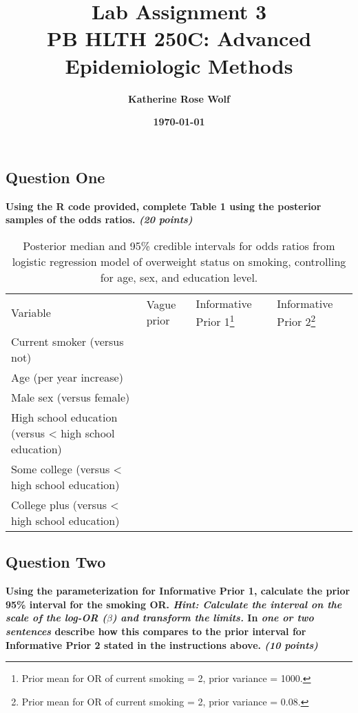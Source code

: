 \documentclass[
  11pt,
]{article}
\title{\fontsize{15pt}{5pt}\selectfont\textbf{Lab Assignment 3}\\
\vspace{.2cm}\textbf{PB HLTH 250C: Advanced Epidemiologic Methods}}
\author{\vspace{-.1cm}\fontsize{15pt}{0pt}\selectfont\textbf{Katherine Rose Wolf}}
\date{\vspace{-.3cm}\fontsize{15pt}{0pt}\selectfont\textbf{\today}}
\begin{document}
\maketitle

\hypertarget{question-one}{%
\subsection{Question One}\label{question-one}}

\textbf{Using the R code provided, complete Table 1 using the posterior samples of the odds ratios. \textit{(20 points)}}

\begin{landscape}
\begin{table}
\begin{minipage}{\textwidth}
\caption{Posterior median and 95\% credible intervals for odds ratios from logistic regression model of overweight status on smoking, controlling for age, sex, and education level.}
\begin{tabular}{llll}
\hline
  Variable & Vague prior & Informative Prior 1\footnote{Prior mean for OR of current smoking = 2, prior variance = 1000.} & Informative Prior 2\footnote{Prior mean for OR of current smoking = 2, prior variance = 0.08.} \\
  \cline{2-4}
Current smoker (versus not)  &       &       & \\
Age (per year increase) &       &      & \\
Male sex (versus female) &       &      & \\
High school education (versus < high school education) &       &      & \\
Some college (versus < high school education) &       &      & \\
College plus (versus < high school education) &       &      & \\
\hline
\end{tabular}
\end{minipage}
\end{table}

\end{landscape}

\pagebreak

\hypertarget{question-two}{%
\subsection{Question Two}\label{question-two}}

\textbf{Using the parameterization for Informative Prior 1, calculate the prior 95\% interval for the smoking OR. \textit{Hint: Calculate the interval on the scale of the log-OR ($\beta$) and transform the limits.} In \textit{one or two sentences} describe how this compares to the prior interval for Informative Prior 2 stated in the instructions above. \textit{(10 points)}}
\end{document}
